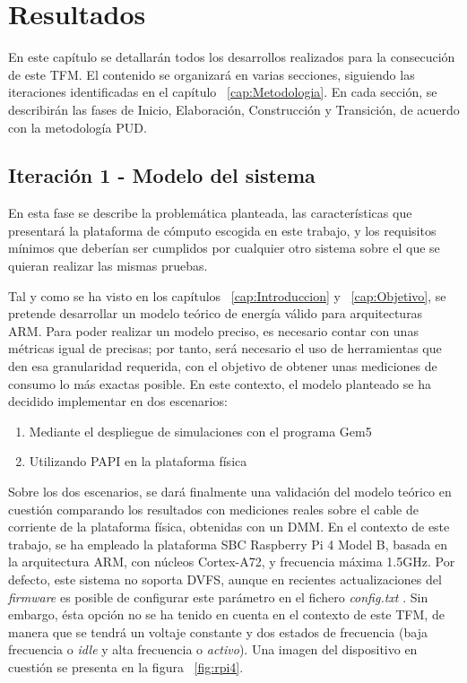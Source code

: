 \usetikzlibrary{shapes.geometric, arrows}
\chapter{Resultados}
\label{cap:Resultados}

En este capítulo se detallarán todos los desarrollos realizados para la consecución de este TFM. El contenido se organizará en varias secciones, siguiendo las iteraciones identificadas en el capítulo ~\ref{cap:Metodologia}. En cada sección, se describirán las fases de Inicio, Elaboración, Construcción y Transición, de acuerdo con la metodología \ac{PUD}.

\section{Iteración 1 - Modelo del sistema}
\label{sec:it1-modelo-sistema}

En esta fase se describe la problemática planteada, las características que presentará la plataforma de cómputo escogida en este trabajo, y los requisitos mínimos que deberían ser cumplidos por cualquier otro sistema sobre el que se quieran realizar las mismas pruebas.

Tal y como se ha visto en los capítulos ~\ref{cap:Introduccion} y ~\ref{cap:Objetivo}, se pretende desarrollar un modelo teórico de energía válido para arquitecturas \ac{ARM}. Para poder realizar un modelo preciso, es necesario contar con unas métricas igual de precisas; por tanto, será necesario el uso de herramientas que den esa granularidad requerida, con el objetivo de obtener unas mediciones de consumo lo más exactas posible. En este contexto, el modelo planteado se ha decidido implementar en dos escenarios:

\begin{enumerate}[noitemsep]
    \item Mediante el despliegue de simulaciones con el programa Gem5
    \item Utilizando \ac{PAPI} en la plataforma física
\end{enumerate}

Sobre los dos escenarios, se dará finalmente una validación del modelo teórico en cuestión comparando los resultados con mediciones reales sobre el cable de corriente de la plataforma física, obtenidas con un \ac{DMM}.
En el contexto de este trabajo, se ha empleado la plataforma \ac{SBC} Raspberry Pi 4 Model B, basada en la arquitectura \ac{ARM}, con núcleos Cortex-A72, y frecuencia máxima 1.5GHz. Por defecto, este sistema no soporta \ac{DVFS}, aunque en recientes actualizaciones del \textit{firmware} es posible de configurar este parámetro en el fichero \textit{config.txt} \cite{dvfs-raspi}. Sin embargo, ésta opción no se ha tenido en cuenta en el contexto de este \ac{TFM}, de manera que se tendrá un voltaje constante y dos estados de frecuencia (baja frecuencia o \textit{idle} y alta frecuencia o \textit{activo}). Una imagen del dispositivo en cuestión se presenta en la figura ~\ref{fig:rpi4}.

